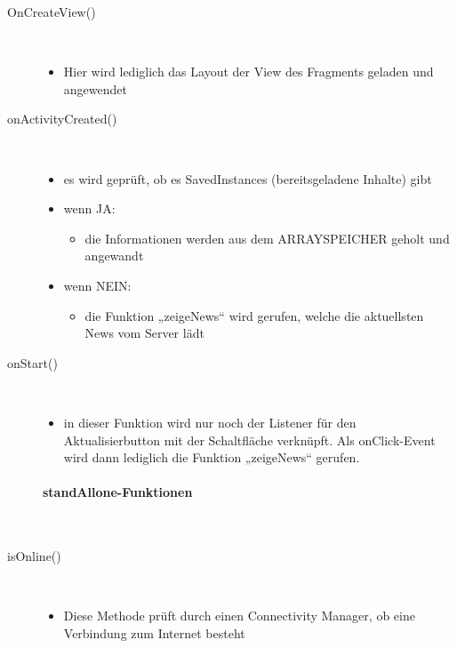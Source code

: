 \begin{description}
\item[OnCreateView()]~\par
\begin{itemize}
\item Hier wird lediglich das Layout der View des Fragments geladen und angewendet
\end{itemize}

\item[onActivityCreated()]~\par
\begin{itemize}
\item es wird geprüft, ob es SavedInstances (bereitsgeladene Inhalte) gibt
\item wenn JA:
\begin{itemize}
\item die Informationen werden aus dem ARRAYSPEICHER geholt und angewandt
\end{itemize}
\item wenn NEIN:
\begin{itemize}
\item die Funktion „zeigeNews“ wird gerufen, welche die aktuellsten News vom Server lädt
\end{itemize}
\end{itemize}

 
\item[onStart()]~\par
\begin{itemize}
\item in dieser Funktion wird nur noch der Listener für den Aktualisierbutton mit der Schaltfläche verknüpft. Als onClick-Event wird dann lediglich die Funktion „zeigeNews“ gerufen.
\end{itemize}

 
\paragraph{standAllone-Funktionen}
\  \\[1em]
\item[isOnline()]~\par
\begin{itemize}
\item Diese Methode prüft durch einen Connectivity Manager, ob eine Verbindung zum Internet besteht
\end{itemize}


\end{description}
